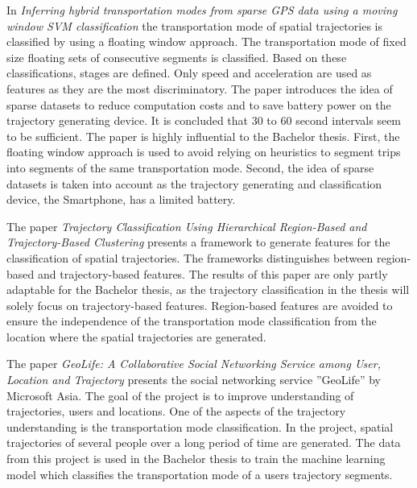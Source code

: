 In \textit{Inferring hybrid transportation modes from sparse GPS data using a moving window SVM classification} \cite{Bolbol2012} the transportation mode of spatial trajectories is classified by using a floating window approach. The transportation mode of fixed size floating sets of consecutive segments is classified. Based on these classifications, stages are defined. Only speed and acceleration are used as features as they are the most discriminatory. The paper introduces the idea of sparse datasets to reduce computation costs and to save battery power on the trajectory generating device. It is concluded that 30 to 60 second intervals seem to be sufficient.\newline
The paper is highly influential to the Bachelor thesis. First, the floating window approach is used to avoid relying on heuristics to segment trips into segments of the same transportation mode. Second, the idea of sparse datasets is taken into account as the trajectory generating and classification device, the Smartphone, has a limited battery. 

The paper \textit{Trajectory Classification Using Hierarchical Region-Based and Trajectory-Based Clustering} \cite{lee2008traclass} presents a framework to generate features for the classification of spatial trajectories. The frameworks distinguishes between region-based and trajectory-based features.  \newline
The results of this paper are only partly adaptable for the Bachelor thesis, as the trajectory classification in the thesis will solely focus on trajectory-based features. Region-based features are avoided to ensure the independence of the transportation mode classification from the location where the spatial trajectories are generated.

The paper \textit{GeoLife: A Collaborative Social Networking Service among User, Location and Trajectory} \cite{zheng2010geolife} presents the social networking service ''GeoLife'' by Microsoft Asia. The goal of the project is to improve understanding of trajectories, users and locations. One of the aspects of the trajectory understanding is the transportation mode classification. In the project, spatial trajectories of several people over a long period of time are generated.
The data from this project is used in the Bachelor thesis to train the machine learning model which classifies the transportation mode of a users trajectory segments.

